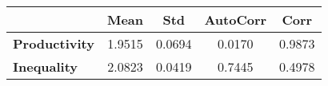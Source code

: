 \begin{tiny}\begin{tabular}{|l|c|c|c|c|}
\hline
&\textbf{Mean}&\textbf{Std}&\textbf{AutoCorr}&\textbf{Corr}\\\hline
\textbf{Productivity}&1.9515&0.0694&0.0170&0.9873\\\hline
\textbf{Inequality}&2.0823&0.0419&0.7445&0.4978\\\hline
\end{tabular}
\end{tiny}